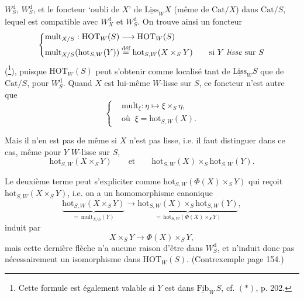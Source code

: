 \documentclass[11pt]{article}
\newcommand{\printedpage}[1]{\marginpar{\footnotesize p.~#1}}
\newcommand{\msp}[1]{\marginpar{\footnotesize [#1]}}
\begin{document}
\setcounter{footnote}{97}

\printedpage{124}

$W_S^{\mathrm{d}}$, $W_S^{\mathrm{d}}$, et le foncteur ‘oubli de $X$’ de $\underline{\mathrm{Liss}}_W X$ (même de $\mathrm{Cat}/X$) dans $\mathrm{Cat}/S$, lequel est compatible avec $W_X^{\mathrm{d}}$ et $W_S^{\mathrm{d}}$. On trouve ainsi un foncteur %
\[
\left\{\begin{aligned}
&\mathrm{mult}_{X/S} : \mathrm{HOT}_W(S) \longrightarrow \mathrm{HOT}_W(S)\\
&\mathrm{mult}_{X/S}(\mathrm{hot}_{S,W}(Y)) \overset{\text{déf}}{=} \mathrm{hot}_{S,W}(X\times_S Y) \qquad \text{si $Y$ \textit{lisse} sur $S$}
\end{aligned}\right.
\]
(\footnote{Cette formule est également valable si $Y$ est dans $\underline{\mathrm{Fib}}_W\, S$, cf. $(*)$, p. 202.}), puisque $\mathrm{HOT}_W(S)$ peut s'obtenir comme localisé tant de $\underline{\mathrm{Liss}}_W S$ que de $\mathrm{Cat}/S$, pour $W_S^{\mathrm{d}}$. Quand $X$ est lui-même $W$-lisse sur $S$, ce foncteur n'est autre que
\[
\left\{\begin{aligned}
&\mathrm{mult}_\xi : \eta \longmapsto \xi\times_S \eta,\\
&\text{où }\ \xi = \mathrm{hot}_{S,W}(X).
\end{aligned}\right.
\]

Mais il n'en est pas de même si $X$ n'est pas lisse, i.e. il faut distinguer dans ce cas, même pour $Y$ $W$-lisse sur $S$,
\[
\mathrm{hot}_{S,W}(X\times_S Y) \qquad\text{et}\qquad \mathrm{hot}_{S,W}(X)\times_S \mathrm{hot}_{S,W}(Y).
\]

Le deuxième terme peut s'expliciter comme $\mathrm{hot}_{S,W}(\Phi(X)\times_S Y)$ qui reçoit $\mathrm{hot}_{S,W}(X\times_S Y)$, i.e.
\msp{page 201}
on a un homomorphisme canonique
\[
\underbrace{\mathrm{hot}_{S,W}(X\times_S Y)}_{=\,\mathrm{mult}_{X/S}(Y)} \longrightarrow \underbrace{\mathrm{hot}_{S,W}(X)\times_S \mathrm{hot}_{S,W}(Y)}_{=\,\mathrm{hot}_{S,W}(\Phi(X)\times_S Y)},
\]
induit par
\[
X\times_S Y \longrightarrow \Phi(X)\times_S Y,
\]
mais cette dernière flèche n'a aucune raison d'être dans $W_S^{\mathrm{d}}$, et n'induit donc pas nécessairement un isomorphisme dans $\mathrm{HOT}_W(S)$. (Contrexemple page 154.)
\end{document}
